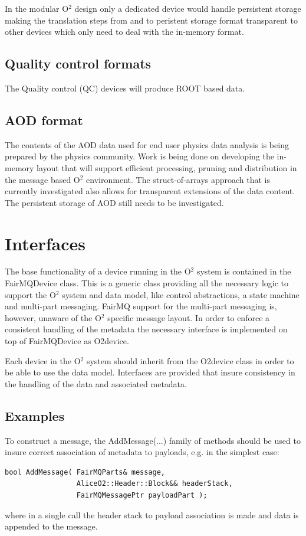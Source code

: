 \documentclass[a4paper,twoside]{article}
\def\O2{O$^2$}
\begin{document}
In the modular \O2 design only a dedicated device would handle persistent storage making the translation steps from and to peristent storage format transparent to other devices which only need to deal with the in-memory format.

\subsection{Quality control formats}
The Quality control (QC) devices will produce ROOT based data.

\subsection{AOD format}
The contents of the AOD data used for end user physics data analysis is being prepared by the physics community. Work is being done on developing the in-memory layout that will support efficient processing, pruning and distribution in the message based \O2 environment. The struct-of-arrays approach that is currently investigated also allows for transparent extensions of the data content. The persistent storage of AOD still needs to be investigated.

\section{Interfaces}
The base functionality of a device running in the \O2 system is contained in the FairMQDevice class. This is a generic class providing all the necessary logic to support the \O2 system and data model, like control abstractions, a state machine and multi-part messaging. FairMQ support for the multi-part messaging is, however, unaware of the \O2 specific message layout. In order to enforce a consistent handling of the metadata the necessary interface is implemented on top of FairMQDevice as O2device.

Each device in the \O2 system should inherit from the O2device class in order to be able to use the data model. Interfaces are provided that insure consistency in the handling of the data and associated metadata.

\subsection{Examples}
To construct a message, the AddMessage(...) family of methods should be used to insure correct association of metadata to payloads, e.g. in the simplest case:
\begin{lstlisting}
bool AddMessage( FairMQParts& message,
                 AliceO2::Header::Block&& headerStack,
                 FairMQMessagePtr payloadPart );
\end{lstlisting}
where in a single call the header stack to payload association is made and data is appended to the message.
\end{document}
